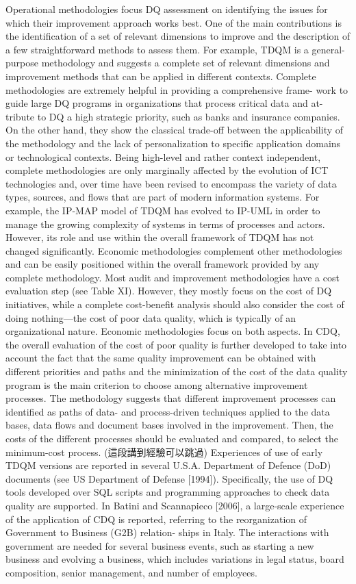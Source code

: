 \documentclass[pdftex,english,oribibl]{llncs}
\begin{document}
Operational methodologies focus DQ assessment on identifying the issues for which their improvement approach works best. One of the main contributions is the identification of a set of relevant dimensions to improve and the description of a few straightforward methods to assess them. For example, TDQM is a general-purpose methodology and suggests a complete set of relevant dimensions and improvement methods that can be applied in different contexts.
Complete methodologies are extremely helpful in providing a comprehensive frame- work to guide large DQ programs in organizations that process critical data and at- tribute to DQ a high strategic priority, such as banks and insurance companies. On the other hand, they show the classical trade-off between the applicability of the methodology and the lack of personalization to specific application domains or technological contexts. Being high-level and rather context independent, complete methodologies are only marginally affected by the evolution of ICT technologies and, over time have been revised to encompass the variety of data types, sources, and flows that are part of modern information systems. For example, the IP-MAP model of TDQM has evolved to IP-UML in order to manage the growing complexity of systems in terms of processes and actors. However, its role and use within the overall framework of TDQM has not changed significantly.
Economic methodologies complement other methodologies and can be easily positioned within the overall framework provided by any complete methodology. Most audit and improvement methodologies have a cost evaluation step (see Table XI). However, they mostly focus on the cost of DQ initiatives, while a complete cost-benefit analysis should also consider the cost of doing nothing—the cost of poor data quality, which is typically of an organizational nature. Economic methodologies focus on both aspects.
In CDQ, the overall evaluation of the cost of poor quality is further developed to take into account the fact that the same quality improvement can be obtained with different priorities and paths and the minimization of the cost of the data quality program is the main criterion to choose among alternative improvement
processes. The methodology suggests that different improvement processes can identified as paths of data- and process-driven techniques applied to the data bases, data flows and document bases involved in the improvement. Then, the costs of the different processes should be evaluated and compared, to select the minimum-cost process.
(這段講到經驗可以跳過)
Experiences of use of early TDQM versions are reported in several U.S.A. Department of Defence (DoD) documents (see US Department of Defense [1994]). Specifically, the use of DQ tools developed over SQL scripts and programming approaches to check data quality are supported.
In Batini and Scannapieco [2006], a large-scale experience of the application of CDQ is reported, referring to the reorganization of Government to Business (G2B) relation- ships in Italy. The interactions with government are needed for several business events, such as starting a new business and evolving a business, which includes variations in legal status, board composition, senior management, and number of employees.
\end{document}
